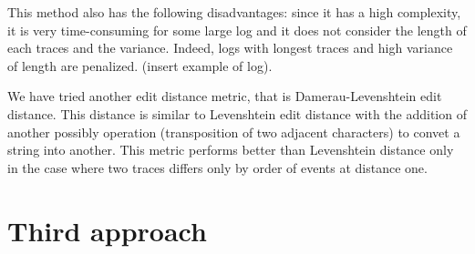 \documentclass[12pt]{article}
\begin{document}
This method also has the following disadvantages: since it has a high complexity, it is very time-consuming for some large log and it does not consider the length of each traces and the variance. Indeed, logs with longest traces and high variance of length are penalized. (insert example of log).

We have tried another edit distance metric, that is Damerau-Levenshtein edit distance. This distance is similar to Levenshtein edit distance with the addition of another possibly operation (transposition of two adjacent characters) to convet a string into another. This metric performs better than Levenshtein distance only in the case where two traces differs only by order of events at distance one.

\section*{Third approach}
\end{document}
